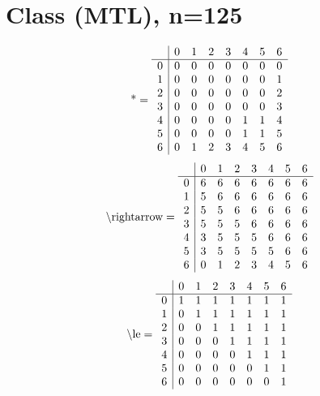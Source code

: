 \documentclass[11pt]{article}
\begin{document}
\section{Class (MTL), n=125}
\[\text{*} = 
\begin{array}{r | r r r r r r r}
 & 0 & 1 & 2 & 3 & 4 & 5 & 6 \\ \hline
0 & 0 & 0 & 0 & 0 & 0 & 0 & 0 \\
1 & 0 & 0 & 0 & 0 & 0 & 0 & 1 \\
2 & 0 & 0 & 0 & 0 & 0 & 0 & 2 \\
3 & 0 & 0 & 0 & 0 & 0 & 0 & 3 \\
4 & 0 & 0 & 0 & 0 & 1 & 1 & 4 \\
5 & 0 & 0 & 0 & 0 & 1 & 1 & 5 \\
6 & 0 & 1 & 2 & 3 & 4 & 5 & 6 \\
\end{array}
\]
\[\text{\textbackslash rightarrow} = 
\begin{array}{r | r r r r r r r}
 & 0 & 1 & 2 & 3 & 4 & 5 & 6 \\ \hline
0 & 6 & 6 & 6 & 6 & 6 & 6 & 6 \\
1 & 5 & 6 & 6 & 6 & 6 & 6 & 6 \\
2 & 5 & 5 & 6 & 6 & 6 & 6 & 6 \\
3 & 5 & 5 & 5 & 6 & 6 & 6 & 6 \\
4 & 3 & 5 & 5 & 5 & 6 & 6 & 6 \\
5 & 3 & 5 & 5 & 5 & 5 & 6 & 6 \\
6 & 0 & 1 & 2 & 3 & 4 & 5 & 6 \\
\end{array}
\]
\[\text{\textbackslash le} = 
\begin{array}{r | r r r r r r r}
 & 0 & 1 & 2 & 3 & 4 & 5 & 6 \\ \hline
0 & 1 & 1 & 1 & 1 & 1 & 1 & 1 \\
1 & 0 & 1 & 1 & 1 & 1 & 1 & 1 \\
2 & 0 & 0 & 1 & 1 & 1 & 1 & 1 \\
3 & 0 & 0 & 0 & 1 & 1 & 1 & 1 \\
4 & 0 & 0 & 0 & 0 & 1 & 1 & 1 \\
5 & 0 & 0 & 0 & 0 & 0 & 1 & 1 \\
6 & 0 & 0 & 0 & 0 & 0 & 0 & 1 \\
\end{array}
\]
\end{document}
